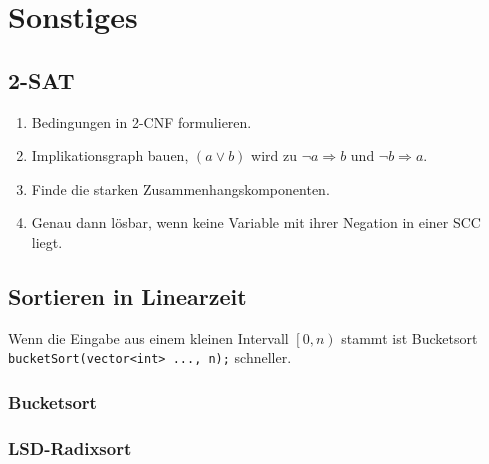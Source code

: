 \section{Sonstiges}

\subsection{2-SAT}
\begin{enumerate}
	\item Bedingungen in 2-CNF formulieren.
	\item Implikationsgraph bauen, $\left(a \vee b\right)$ wird zu $\neg a \Rightarrow b$ und $\neg b \Rightarrow a$.
	\item Finde die starken Zusammenhangskomponenten.
	\item Genau dann lösbar, wenn keine Variable mit ihrer Negation in einer SCC liegt.
\end{enumerate}

\subsection{Sortieren in Linearzeit}
Wenn die Eingabe aus einem kleinen Intervall $\left[0, n\right)$ stammt ist Bucketsort \lstinline{bucketSort(vector<int> ..., n);} schneller.

\subsubsection{Bucketsort}


\subsubsection{LSD-Radixsort}

